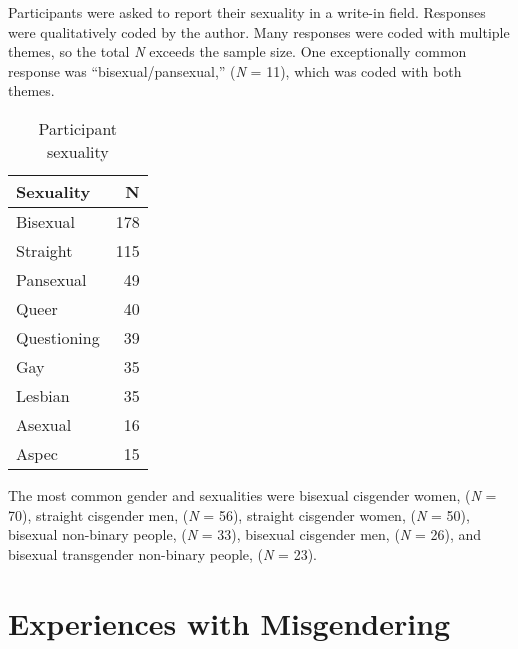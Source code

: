 \documentclass[12pt,twoside]{reedthesis}
\begin{document}
Participants were asked to report their sexuality in a write-in field. Responses were qualitatively coded by the author. Many responses were coded with multiple themes, so the total \emph{N} exceeds the sample size. One exceptionally common response was ``bisexual/pansexual,'' (\emph{N} = 11), which was coded with both themes.
\begin{table}

\caption{\label{tab:unnamed-chunk-4}Participant sexuality}
\centering
\begin{tabular}[t]{l|r}
\hline
Sexuality & N\\
\hline
Bisexual & 178\\
\hline
Straight & 115\\
\hline
Pansexual & 49\\
\hline
Queer & 40\\
\hline
Questioning & 39\\
\hline
Gay & 35\\
\hline
Lesbian & 35\\
\hline
Asexual & 16\\
\hline
Aspec & 15\\
\hline
\end{tabular}
\end{table}
The most common gender and sexualities were bisexual cisgender women, (\emph{N} = 70), straight cisgender men, (\emph{N} = 56), straight cisgender women, (\emph{N} = 50), bisexual non-binary people, (\emph{N} = 33), bisexual cisgender men, (\emph{N} = 26), and bisexual transgender non-binary people, (\emph{N} = 23).

\hypertarget{experiences-with-misgendering}{%
\section{Experiences with Misgendering}\label{experiences-with-misgendering}}
\end{document}
